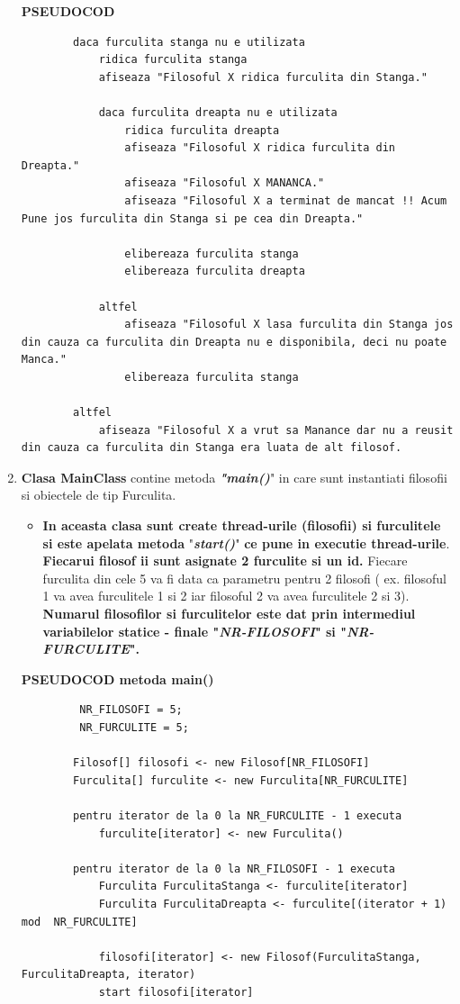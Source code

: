 \documentclass[14pt]{article}
\begin{document}
\begin{enumerate}
 \textbf{PSEUDOCOD}
 \begin{lstlisting}
	    daca furculita stanga nu e utilizata
	        ridica furculita stanga
	    	afiseaza "Filosoful X ridica furculita din Stanga."
	   
	        daca furculita dreapta nu e utilizata
	            ridica furculita dreapta
	    	    afiseaza "Filosoful X ridica furculita din Dreapta."
	            afiseaza "Filosoful X MANANCA."
	            afiseaza "Filosoful X a terminat de mancat !! Acum Pune jos furculita din Stanga si pe cea din Dreapta."
	            
	            elibereaza furculita stanga
	            elibereaza furculita dreapta
	            
	        altfel
	        	afiseaza "Filosoful X lasa furculita din Stanga jos din cauza ca furculita din Dreapta nu e disponibila, deci nu poate Manca."
	        	elibereaza furculita stanga
	       
	    altfel
	    	afiseaza "Filosoful X a vrut sa Manance dar nu a reusit din cauza ca furculita din Stanga era luata de alt filosof.
\end{lstlisting}

\item \textbf{Clasa MainClass} contine metoda \textbf{\textit{"main()}}" in care sunt instantiati filosofii si obiectele de tip Furculita.


\begin{itemize}
\item \textbf{In aceasta clasa sunt create thread-urile (filosofii) si furculitele si este apelata metoda} "\textbf{\textit{start()}}" \textbf{ce pune in executie thread-urile}. \textbf{Fiecarui filosof ii sunt asignate 2 furculite si un id.} Fiecare furculita din cele 5 va fi data ca parametru pentru 2 filosofi ( ex. filosoful 1 va avea furculitele 1 si 2 iar filosoful 2 va avea furculitele 2 si 3). \textbf{Numarul filosofilor si furculitelor este dat prin intermediul variabilelor statice - finale "\textit{NR-FILOSOFI}" si "\textit{NR-FURCULITE}".}
\end{itemize}

 \textbf{PSEUDOCOD metoda main()}
 \begin{lstlisting}
 	     NR_FILOSOFI = 5;
	     NR_FURCULITE = 5;
 
        Filosof[] filosofi <- new Filosof[NR_FILOSOFI]
        Furculita[] furculite <- new Furculita[NR_FURCULITE]

        pentru iterator de la 0 la NR_FURCULITE - 1 executa
        	furculite[iterator] <- new Furculita()

        pentru iterator de la 0 la NR_FILOSOFI - 1 executa
        	Furculita FurculitaStanga <- furculite[iterator]
        	Furculita FurculitaDreapta <- furculite[(iterator + 1) mod  NR_FURCULITE]

        	filosofi[iterator] <- new Filosof(FurculitaStanga, FurculitaDreapta, iterator)
        	start filosofi[iterator]
\end{lstlisting}

\end{enumerate}
\end{document}
